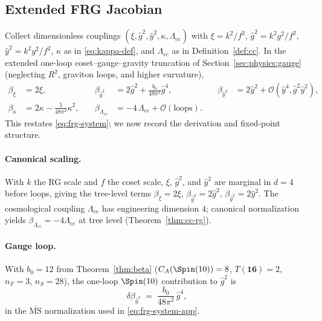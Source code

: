 \subsection{Extended FRG Jacobian}
\label{sec:appendix:frg}

Collect dimensionless couplings
$(\xi,\hat g^2,\hat y^2,\kappa,\Lambda_{\mathrm{cc}})$ with
$\xi=k^2/f^2$, $\hat g^2=k^2 g^2/f^2$, $\hat y^2=k^2 y^2/f^2$,
$\kappa$ as in \eqref{eq:kappa-def}, and $\Lambda_{\mathrm{cc}}$ as in
Definition~\ref{def:cc}. In the extended one-loop coset--gauge--gravity
truncation of Section~\ref{sec:physics:gauge} (neglecting $R^2$, graviton
loops, and higher curvature),
\begin{equation}\label{eq:frg-system-app}
\begin{aligned}
  \beta_{\xi}&=2\xi,
  &\quad
  \beta_{\hat g^2}&=2\hat g^2+\frac{b_0}{48\pi^2}\hat g^4,
  &\quad
  \beta_{\hat y^2}&=2\hat y^2+\mathcal{O}(\hat y^4,\hat g^2\hat y^2),
  \\[4pt]
  \beta_{\kappa}&=2\kappa-\frac{5}{48\pi^2}\kappa^2,
  &\quad
  \beta_{\Lambda_{\mathrm{cc}}}&=-4\,\Lambda_{\mathrm{cc}}+\mathcal{O}(\text{loops}).
\end{aligned}
\end{equation}
This restates \eqref{eq:frg-system}; we now record the derivation and
fixed-point structure.

\paragraph{Canonical scaling.}
With $k$ the RG scale and $f$ the coset scale, $\xi$, $\hat g^2$, and
$\hat y^2$ are marginal in $d=4$ before loops, giving the tree-level terms
$\beta_{\xi}=2\xi$, $\beta_{\hat g^2}=2\hat g^2$, $\beta_{\hat y^2}=2\hat y^2$.
The cosmological coupling $\Lambda_{\mathrm{cc}}$ has engineering dimension
$4$; canonical normalization yields $\beta_{\Lambda_{\mathrm{cc}}}=-4\Lambda_{\mathrm{cc}}$
at tree level (Theorem~\ref{thm:cc-rg}).

\paragraph{Gauge loop.}
With $b_0=12$ from Theorem~\ref{thm:beta} ($C_A(\Spin(10))=8$,
$T(\mathbf{16})=2$, $n_F=3$, $n_S=28$), the one-loop $\Spin(10)$ contribution
to $\hat g^2$ is
\begin{equation}\label{eq:beta-g4}
  \delta\beta_{\hat g^2}
  \;=\;
  \frac{b_0}{48\pi^2}\,\hat g^4,
\end{equation}
in the $\overline{\mathrm{MS}}$ normalization used in \eqref{eq:frg-system-app}.

